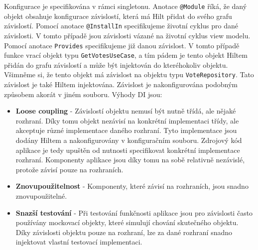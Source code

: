 \noindent Konfigurace je specifikována v rámci singletonu. Anotace \lstinline|@Module| říká, že daný objekt obsahuje konfigurace závislostí, která má Hilt přidat do svého grafu závislostí. Pomocí anotace \lstinline|@InstallIn| specifikujeme životní cyklus pro dané závislosti. V tomto případě jsou závislosti vázané na životní cyklus view modelu. Pomocí anotace \lstinline|Provides| specifikujeme již danou závislost. V tomto případě funkce vrací objekt typu \lstinline|GetVotesUseCase|, a tím pádem je tento objekt Hiltem přidán do grafu závislostí a může být injektován do kteréhokoliv objektu. Všimněme si, že tento objekt má závislost na objektu typu \lstinline|VoteRepository|. Tato závislost je také Hiltem injektována. Závislost je nakonfigurována podobným způsobem akorát v jiném souboru. Výhody DI jsou:

\begin{itemize}
	\item \textbf{Loose coupling} - Závislostí objektu nemusí být nutně třídá, ale nějaké rozhraní. Díky tomu objekt nezávisí na konkrétní implementaci třídy, ale akceptuje různé implementace daného rozhraní. Tyto implementace jsou dodány Hiltem a nakonfigurovány v konfiguračním souboru. Zdrojový kód aplikace je tedy upuštěn od nutnosti specifikovat konkrétní implementace rozhraní. Komponenty aplikace jsou díky tomu na sobě relativně nezávislé, protože závisí pouze na rozhraních. 
	
	\item \textbf{Znovupoužitelnost} - Komponenty, které závisí na rozhraních, jsou snadno znovupoužitelné.
	
	\item \textbf{Snazší testování} - Při testování funkčnosti aplikace jsou pro závislosti často používány mockovací objekty, které simulují chování skutečného objektu. Díky závislosti objektu pouze na rozhraní, lze za dané rozhraní snadno injektovat vlastní testovací implementaci. 
\end{itemize}


